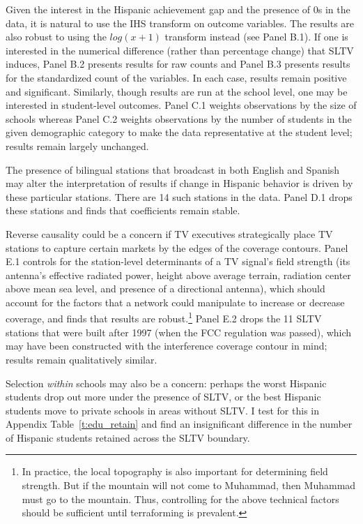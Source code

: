 \documentclass[11pt]{article}
\begin{document}
Given the interest in the Hispanic achievement gap and the presence of 0s in the data, it is natural to use the IHS transform on outcome variables. The results are also robust to using the $log(x+1)$ transform instead (see Panel B.1). If one is interested in the numerical difference (rather than percentage change) that SLTV induces, Panel B.2 presents results for raw counts and Panel B.3 presents results for the standardized count of the variables. In each case, results remain positive and significant. Similarly, though results are run at the school level, one may be interested in student-level outcomes. Panel C.1 weights observations by the size of schools whereas Panel C.2 weights observations by the number of students in the given demographic category to make the data representative at the student level; results remain largely unchanged.

The presence of bilingual stations that broadcast in both English and Spanish may alter the interpretation of results if change in Hispanic behavior is driven by these particular stations. There are 14 such stations in the data. Panel D.1 drops these stations and finds that coefficients remain stable. 

Reverse causality could be a concern if TV executives strategically place TV stations to capture certain markets by the edges of the coverage contours. Panel E.1 controls for the station-level determinants of a TV signal's field strength (its antenna's effective radiated power, height above average terrain, radiation center above mean sea level, and presence of a directional antenna), which should account for the factors that a network could manipulate to increase or decrease coverage, and finds that results are robust.\footnote{In practice, the local topography is also important for determining field strength. But if the mountain will not come to Muhammad, then Muhammad must go to the mountain. Thus, controlling for the above technical factors should be sufficient until terraforming is prevalent.} Panel E.2 drops the 11 SLTV stations that were built after 1997 (when the FCC regulation was passed), which may have been constructed with the interference coverage contour in mind; results remain qualitatively similar.

Selection \textit{within} schools may also be a concern: perhaps the worst Hispanic students drop out more under the presence of SLTV, or the best Hispanic students move to private schools in areas without SLTV. I test for this in Appendix Table~\ref{t:edu_retain} and find an insignificant difference in the number of Hispanic students retained across the SLTV boundary.
\end{document}

